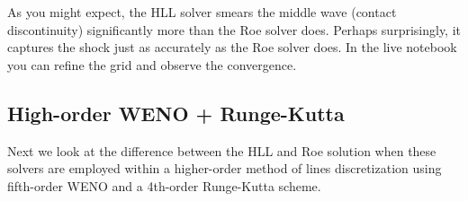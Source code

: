 \documentclass{SIAMbook2016}
\begin{document}
As you might expect, the HLL solver smears the middle wave (contact
discontinuity) significantly more than the Roe solver does. Perhaps
surprisingly, it captures the shock just as accurately as the Roe solver
does. In the live notebook you can refine the grid and observe the
convergence.

\hypertarget{high-order-weno-runge-kutta}{%
\subsection{High-order WENO +
Runge-Kutta}\label{high-order-weno-runge-kutta}}

Next we look at the difference between the HLL and Roe solution when
these solvers are employed within a higher-order method of lines
discretization using fifth-order WENO and a 4th-order Runge-Kutta
scheme.
\end{document}

